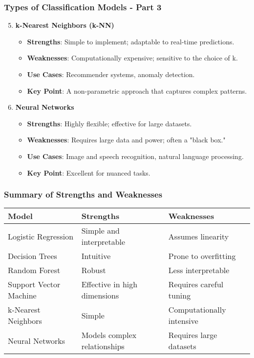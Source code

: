 \documentclass[aspectratio=169]{beamer}
\begin{document}
\begin{frame}[fragile]
    \frametitle{Types of Classification Models - Part 3}
    \begin{enumerate}
        \setcounter{enumi}{4} %
        \item \textbf{k-Nearest Neighbors (k-NN)}
            \begin{itemize}
                \item \textbf{Strengths}: Simple to implement; adaptable to real-time predictions.
                \item \textbf{Weaknesses}: Computationally expensive; sensitive to the choice of k.
                \item \textbf{Use Cases}: Recommender systems, anomaly detection.
                \item \textbf{Key Point}: A non-parametric approach that captures complex patterns.
            \end{itemize}

        \item \textbf{Neural Networks}
            \begin{itemize}
                \item \textbf{Strengths}: Highly flexible; effective for large datasets.
                \item \textbf{Weaknesses}: Requires large data and power; often a "black box."
                \item \textbf{Use Cases}: Image and speech recognition, natural language processing.
                \item \textbf{Key Point}: Excellent for nuanced tasks.
            \end{itemize}
    \end{enumerate}
\end{frame}

\begin{frame}[fragile]
    \frametitle{Summary of Strengths and Weaknesses}
    \begin{center}
    \begin{tabular}{|l|l|l|}
        \hline
        \textbf{Model} & \textbf{Strengths} & \textbf{Weaknesses} \\
        \hline
        Logistic Regression & Simple and interpretable & Assumes linearity \\
        Decision Trees & Intuitive & Prone to overfitting \\
        Random Forest & Robust & Less interpretable \\
        Support Vector Machine & Effective in high dimensions & Requires careful tuning \\
        k-Nearest Neighbors & Simple & Computationally intensive \\
        Neural Networks & Models complex relationships & Requires large datasets \\
        \hline
    \end{tabular}
    \end{center}
\end{frame}
\end{document}
